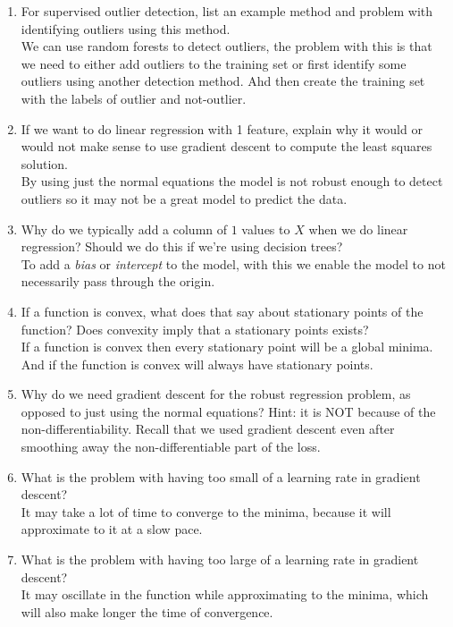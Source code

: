 \documentclass{article}
\def\ans#1{{\color{ans}#1}}
\begin{document}
\begin{enumerate}
{}
\item For supervised outlier detection, list an example method and problem with identifying outliers using this method.\\
\ans{
    We can use random forests to detect outliers, the problem with this is that we need to either 
    add outliers to the training set or first identify some outliers using another detection method. 
    Ahd then create the training set with the labels of outlier and not-outlier.
}
\item If we want to do linear regression with 1 feature, explain why it would or would not make sense to use gradient descent to compute the least squares solution.\\
\ans{
    By using just the normal equations the model is not robust enough to detect outliers so it may 
    not be a great model to predict the data.
}
\item Why do we typically add a column of $1$ values to $X$ when we do linear regression? Should we do this if we're using decision trees?\\
\ans{
    To add a \emph{bias} or \emph{intercept} to the model, with this we enable the model to not 
    necessarily pass through the origin.
}
\item If a function is convex, what does that say about stationary points of the function? Does convexity imply that a stationary points exists?\\
\ans{
    If a function is convex then every stationary point will be a global minima. And if the function is 
    convex will always have stationary points.
}
\item Why do we need gradient descent for the robust regression problem, as opposed to just using the normal equations? Hint: it is NOT because of the non-differentiability. Recall that we used gradient descent even after smoothing away the non-differentiable part of the loss.\\
\ans{
}
\item What is the problem with having too small of a learning rate in gradient descent?\\
\ans{
    It may take a lot of time to converge to the minima, because it will approximate to it at a 
    slow pace.
}
\item What is the problem with having too large of a learning rate in gradient descent?\\
\ans{
    It may oscillate in the function while approximating to the minima, which will also make longer 
    the time of convergence.
}
\end{enumerate}
\end{document}
